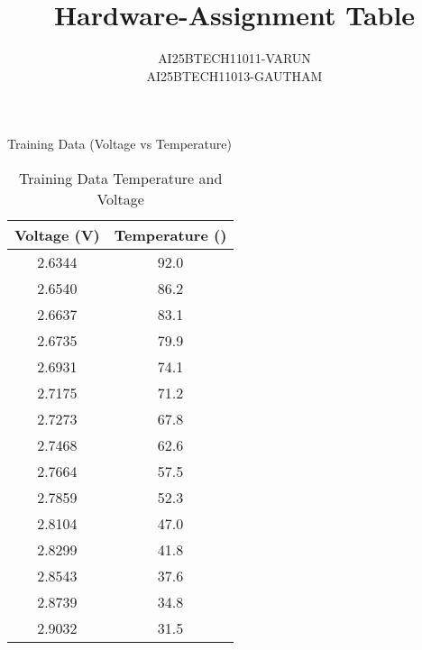 \documentclass[journal]{IEEEtran}
\begin{document}

\vspace{3cm}

\title{Hardware-Assignment Table}
\author{AI25BTECH11011-VARUN \\
AI25BTECH11013-GAUTHAM}
 \maketitle
{\let\newpage\relax\maketitle}

\renewcommand{\thefigure}{\theenumi}
\renewcommand{\thetable}{\theenumi}
\setlength{\intextsep}{10pt} %


\renewcommand{\thetable}{\theenumi}
\begin{table}[h!]
\centering
\caption{Training Data (Voltage vs Temperature)}
\begin{tabular}{|c|c|}
\hline
	\textbf{Voltage (V)} & \textbf{Temperature (\degree{C})} \\ 
\hline
2.6344 & 92.0 \\
2.6540 & 86.2 \\
2.6637 & 83.1 \\
2.6735 & 79.9 \\
2.6931 & 74.1 \\
2.7175 & 71.2 \\
2.7273 & 67.8 \\
2.7468 & 62.6 \\
2.7664 & 57.5 \\
2.7859 & 52.3 \\
2.8104 & 47.0 \\
2.8299 & 41.8 \\
2.8543 & 37.6 \\
2.8739 & 34.8 \\
2.9032 & 31.5 \\
\hline
\end{tabular}
	\caption{Training Data Temperature and Voltage}
	\label{tab:Training Data}
\end{table}
\end{document}

